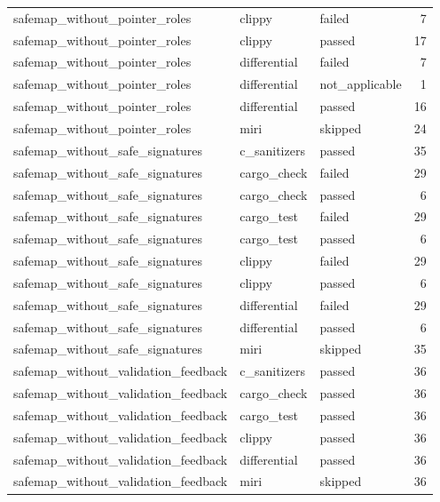 \begin{table}[t]
\begin{tabular}{lllr}
safemap\_without\_pointer\_roles & clippy & failed & 7 \\
safemap\_without\_pointer\_roles & clippy & passed & 17 \\
safemap\_without\_pointer\_roles & differential & failed & 7 \\
safemap\_without\_pointer\_roles & differential & not\_applicable & 1 \\
safemap\_without\_pointer\_roles & differential & passed & 16 \\
safemap\_without\_pointer\_roles & miri & skipped & 24 \\
safemap\_without\_safe\_signatures & c\_sanitizers & passed & 35 \\
safemap\_without\_safe\_signatures & cargo\_check & failed & 29 \\
safemap\_without\_safe\_signatures & cargo\_check & passed & 6 \\
safemap\_without\_safe\_signatures & cargo\_test & failed & 29 \\
safemap\_without\_safe\_signatures & cargo\_test & passed & 6 \\
safemap\_without\_safe\_signatures & clippy & failed & 29 \\
safemap\_without\_safe\_signatures & clippy & passed & 6 \\
safemap\_without\_safe\_signatures & differential & failed & 29 \\
safemap\_without\_safe\_signatures & differential & passed & 6 \\
safemap\_without\_safe\_signatures & miri & skipped & 35 \\
safemap\_without\_validation\_feedback & c\_sanitizers & passed & 36 \\
safemap\_without\_validation\_feedback & cargo\_check & passed & 36 \\
safemap\_without\_validation\_feedback & cargo\_test & passed & 36 \\
safemap\_without\_validation\_feedback & clippy & passed & 36 \\
safemap\_without\_validation\_feedback & differential & passed & 36 \\
safemap\_without\_validation\_feedback & miri & skipped & 36 \\
\hline
\end{tabular}
\end{table}
